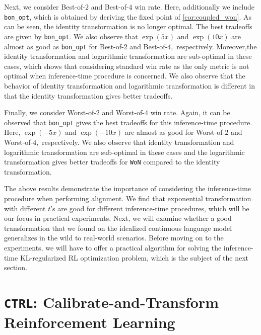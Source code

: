 \documentclass{article}
\newcommand{\ctrl}{\texttt{CTRL}\xspace}
\newcommand{\wofn}{\texttt{WoN}\xspace}
\begin{document}
Next, we consider Best-of-$2$ and Best-of-$4$ win rate. Here, additionally we include \texttt{bon\_opt}, which is obtained by deriving the fixed point of \cref{cor:coupled_won}. As can be seen, the identity transformation is no longer optimal. The best tradeoffs are given by \texttt{bon\_opt}. We also observe that $\exp(5x)$ and $\exp(10x)$ are almost as good as \texttt{bon\_opt} for Best-of-$2$ and Best-of-$4,$ respectively. Moreover,the identity transformation and logarithmic transformation are sub-optimal in these cases, which shows that considering standard win rate as the only metric is not optimal when inference-time procedure is concerned.  We also observe that the behavior of identity transformation and logarithmic transformation is different in that the identity transformation gives better tradeoffs.

Finally, we consider Worst-of-$2$ and Worst-of-$4$ win rate. Again, it can be observed that \texttt{bon\_opt} gives the best tradeoffs for this inference-time procedure. Here, $\exp(-5x)$ and $\exp(-10x)$ are almost as good for Worst-of-$2$ and Worst-of-$4,$ respectively. We also observe that identity transformation and logarithmic transformation are sub-optimal in these cases and the logarithmic transformation gives better tradeoffs for \wofn compared to the identity transformation.


%
%
%
%

The above results demonstrate the importance of considering the inference-time procedure when performing alignment. We find that exponential transformation with different $t$'s are good for different inference-time procedures, which will be our focus in practical experiments.
%
Next, we will examine whether a good transformation that we found on the idealized continuous language model generalizes in the wild to real-world scenarios. Before moving on to the experiments, we will have to offer a practical algorithm for solving the inference-time KL-regularized RL optimization problem, which is the subject of the next section.

%



%


%
%
%
%
%
%
%
%




%
%
%
%
%
%
%

%
\section{\ctrl: Calibrate-and-Transform Reinforcement Learning} \label{sec:implementation}
%
\end{document}
